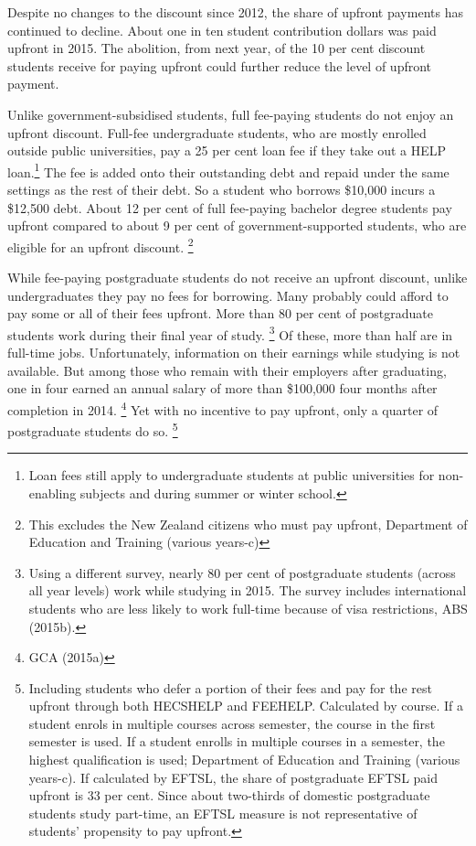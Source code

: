 \documentclass[embargoed]{grattan}
\begin{document}
Despite no changes to the discount since 2012, the share of upfront payments has continued to decline.
About one in ten student contribution dollars was paid upfront in 2015.
The abolition, from next year, of the 10 per cent discount students receive for paying upfront could further reduce the level of upfront payment.

Unlike government-subsidised students, full fee-paying students do not enjoy an upfront discount.
Full-fee undergraduate students, who are mostly enrolled outside public universities, pay a 25 per cent loan fee if they take out a \gls{HELP} loan.\footnote{Loan fees still apply to undergraduate students at public universities for non-enabling subjects and during summer or winter school.} The fee is added onto their outstanding debt and repaid under the same settings as the rest of their debt.
So a student who borrows \$10,000 incurs a \$12,500 debt.
About 12 per cent of full fee-paying bachelor degree students pay upfront compared to about 9 per cent of government-supported students, who are eligible for an upfront discount.%
\footnote{This excludes the New Zealand citizens who must pay upfront, Department of Education and Training (various years-c)}

While fee-paying postgraduate students do not receive an upfront discount, unlike undergraduates they pay no fees for borrowing.
Many probably could afford to pay some or all of their fees upfront.
More than 80 per cent of postgraduate students work during their final year of study.%
\footnote{Using a different survey, nearly 80 per cent of postgraduate students (across all year levels) work while studying in 2015.
The survey includes international students who are less likely to work full-time because of visa restrictions, ABS (2015b).} Of these, more than half are in full-time jobs.
Unfortunately, information on their earnings while studying is not available.
But among those who remain with their employers after graduating, one in four earned an annual salary of more than \$100,000 four months after completion in 2014.%
\footnote{GCA (2015a)} Yet with no incentive to pay upfront, only a quarter of postgraduate students do so.%
\footnote{Including students who defer a portion of their fees and pay for the rest upfront through both \gls{HECSHELP} and \gls{FEEHELP}.
Calculated by course.
If a student enrols in multiple courses across semester, the course in the first semester is used.
If a student enrolls in multiple courses in a semester, the highest qualification is used; Department of Education and Training (various years-c).
If calculated by \gls{EFTSL}, the share of postgraduate \gls{EFTSL} paid upfront is 33 per cent.
Since about two-thirds of domestic postgraduate students study part-time, an \gls{EFTSL} measure is not representative of students' propensity to pay upfront.}
\end{document}
